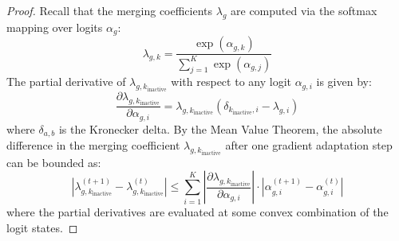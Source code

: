 \documentclass{article}
\theoremstyle{plain}
\theoremstyle{definition}
\theoremstyle{remark}
\begin{document}
\begin{proof}
Recall that the merging coefficients $\lambda_{g}$ are computed via the softmax mapping over logits $\alpha_g$:
\begin{equation}
    \lambda_{g, k} = \frac{\exp(\alpha_{g, k})}{\sum_{j=1}^K \exp(\alpha_{g, j})}
\end{equation}
The partial derivative of $\lambda_{g, k_{\text{inactive}}}$ with respect to any logit $\alpha_{g, i}$ is given by:
\begin{equation}
    \frac{\partial \lambda_{g, k_{\text{inactive}}}}{\partial \alpha_{g, i}} = \lambda_{g, k_{\text{inactive}}} (\delta_{k_{\text{inactive}}, i} - \lambda_{g, i})
\end{equation}
where $\delta_{a, b}$ is the Kronecker delta. By the Mean Value Theorem, the absolute difference in the merging coefficient $\lambda_{g, k_{\text{inactive}}}$ after one gradient adaptation step can be bounded as:
\begin{equation}
    \left| \lambda^{(t+1)}_{g, k_{\text{inactive}}} - \lambda^{(t)}_{g, k_{\text{inactive}}} \right| \leq \sum_{i=1}^K \left| \frac{\partial \lambda_{g, k_{\text{inactive}}}}{\partial \alpha_{g, i}} \right| \cdot \left| \alpha^{(t+1)}_{g, i} - \alpha^{(t)}_{g, i} \right|
\end{equation}
where the partial derivatives are evaluated at some convex combination of the logit states. 


\end{proof}
\end{document}
